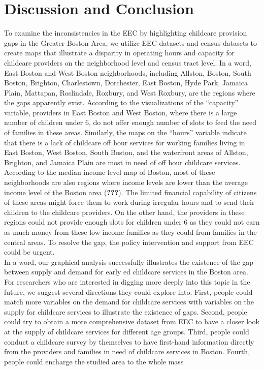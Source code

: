 \documentclass[man]{apa6}
\begin{document}
\section{Discussion and Conclusion}\label{discussion-and-conclusion}

To examine the inconsistencies in the EEC by highlighting childcare
provision gaps in the Greater Boston Area, we utilize EEC datasets and
census datasets to create maps that illustrate a disparity in operating
hours and capacity for childcare providers on the neighborhood level and
census tract level. In a word, East Boston and West Boston
neighborhoods, including Allston, Boston, South Boston, Brighton,
Charlestown, Dorchester, East Boston, Hyde Park, Jamaica Plain,
Mattapan, Roslindale, Roxbury, and West Roxbury, are the regions where
the gaps apparently exist. According to the visualizations of the
\enquote{capacity} variable, providers in East Boston and West Boston,
where there is a large number of children under 6, do not offer enough
number of slots to feed the need of families in these areas. Similarly,
the maps on the \enquote{hours} variable indicate that there is a lack
of childcare off hour services for working families living in East
Boston, West Boston, South Boston, and the waterfront areas of Allston,
Brighton, and Jamaica Plain are most in need of off hour childcare
services. According to the median income level map of Boston, most of
these neighborhoods are also regions where income levels are lower than
the average income level of the Boston area ({\textbf{???}}). The
limited financial capability of citizens of these areas might force them
to work during irregular hours and to send their children to the
childcare providers. On the other hand, the providers in these regions
could not provide enough slots for children under 6 as they could not
earn as much money from these low-income families as they could from
families in the central areas. To resolve the gap, the policy
intervention and support from EEC could be urgent.\\
In a word, our graphical analysis successfully illustrates the existence
of the gap between supply and demand for early ed childcare services in
the Boston area. For researchers who are interested in digging more
deeply into this topic in the future, we suggest several directions they
could explore into. First, people could match more variables on the
demand for childcare services with variables on the supply for childcare
services to illustrate the existence of gaps. Second, people could try
to obtain a more comprehensive dataset from EEC to have a closer look at
the supply of childcare services for different age groups. Third, people
could conduct a childcare survey by themselves to have first-hand
information directly from the providers and families in need of
childcare services in Boston. Fourth, people could encharge the studied
area to the whole mass
\end{document}
